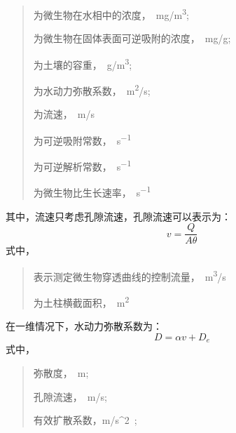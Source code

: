 \documentclass[a4paper,cs4size,adobefonts,fancyhdr]{ctexart}[2005/11/25]
\numberwithin{equation}{section} %
\begin{document}
	\begin{quote}
	\begin{description}\setlength{\itemsep}{0em}
	\item[$C$]为微生物在水相中的浓度，\SI{}{mg/m^3};
	\item[$S$]为微生物在固体表面可逆吸附的浓度，\SI{}{mg/g};
	\item[$\rho$]为土壤的容重，\SI{}{g/m^3};
	\item[$D$]为水动力弥散系数，\SI{}{m^2/s};
	\item[$v$]为流速，\SI{}{m/s}
	\item[$k_{att}$]为可逆吸附常数，\SI{}{s^{-1}}
	\item[$k_{det}$]为可逆解析常数，\SI{}{s^{-1}}
	\item[$\sigma$]为微生物比生长速率，\SI{}{s^{-1}}
	\end{description}
	\end{quote}\par
其中，流速只考虑孔隙流速，孔隙流速可以表示为：
\begin{equation}
	v=\dfrac{Q}{A\theta}
\end{equation}
式中，
	\begin{quote}
	\begin{description}\setlength{\itemsep}{0em}
	\item[$Q$]表示测定微生物穿透曲线的控制流量，\SI{}{m^3/s}
	\item[$A$]为土柱横截面积，\SI{}{m^2}
	\end{description}
	\end{quote}\par
在一维情况下，水动力弥散系数为：
\begin{equation}
	D=\alpha v+D_e
\end{equation}
式中，
\begin{quote}
\unskip
\begin{description}\setlength{\itemsep}{0em}
	\item[$\alpha$]弥散度，\SI{}{m};
	\item[$v$]孔隙流速，\SI{}{m/s};
	\item[$D_e$]有效扩散系数，\SI{m/s^2};
\end{description}\par
\ignorespaces
\end{quote}
\end{document}
